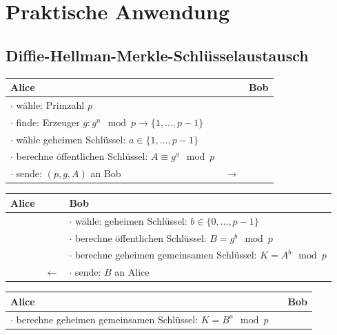 \documentclass[utf8]{beamer}
\begin{document}
\section{Praktische Anwendung}
\label{sec:praktische_anwendung}

\subsection{Diffie-Hellman-Merkle-Schlüsselaustausch}
\label{sub:diffie_hellman_merkle_schlusselaustausch}

\begin{frame}{\insertsubsectionhead}
  \begin{center}
    \begin{tabularx}{\textwidth}{Xcl}
      \textbf{Alice} & & \textbf{Bob}\\\midrule
      $\cdot$ wähle: Primzahl $p$\\
      $\cdot$ finde: Erzeuger $g: g^n \mod p \to \{1, \ldots, p-1\}$\\
      $\cdot$ wähle geheimen Schlüssel: $a \in \{1, \ldots, p-1\}$\\
      $\cdot$ berechne öffentlichen Schlüssel: $A \equiv g^a \mod p$\\
      $\cdot$ sende: $(p, g, A)$ an Bob & $\to$
    \end{tabularx}
  \end{center}

  \pause

  \begin{center}
    \begin{tabularx}{\textwidth}{lcX}
      \textbf{Alice} &  & \textbf{Bob}\\\midrule
      & & $\cdot$ wähle: geheimen Schlüssel: $b\in \{ 0 ,\ldots , p - 1 \}$\\
      & & $\cdot$ berechne öffentlichen Schlüssel: $B = g^b \mod p$\\
      & & $\cdot$ berechne geheimen gemeinsamen Schlüssel: $K = A^b \mod p$\\
      & $\leftarrow$ & $\cdot$ sende: $B$ an Alice
    \end{tabularx}
  \end{center}

  \pause

  \begin{center}
    \begin{tabularx}{\textwidth}{Xcl}
      \textbf{Alice} &  & \textbf{Bob}\\\midrule
      $\cdot$ berechne geheimen gemeinsamen Schlüssel: $K = B^a \mod p$
    \end{tabularx}
  \end{center}
\end{frame}
\end{document}
